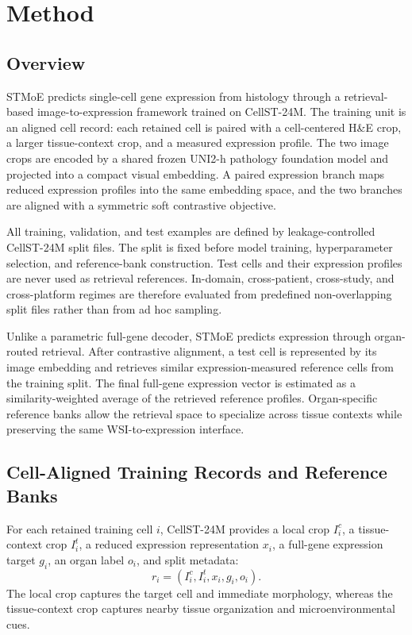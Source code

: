 \documentclass[sigconf]{acmart}
\newcommand{\dataset}{CellST-24M\xspace}
\newcommand{\method}{STMoE\xspace}
\begin{document}
\section{Method}

\subsection{Overview}

\method{} predicts single-cell gene expression from histology through a retrieval-based image-to-expression framework trained on \dataset{}. The training unit is an aligned cell record: each retained cell is paired with a cell-centered H\&E crop, a larger tissue-context crop, and a measured expression profile. The two image crops are encoded by a shared frozen UNI2-h pathology foundation model and projected into a compact visual embedding. A paired expression branch maps reduced expression profiles into the same embedding space, and the two branches are aligned with a symmetric soft contrastive objective.

All training, validation, and test examples are defined by leakage-controlled \dataset{} split files. The split is fixed before model training, hyperparameter selection, and reference-bank construction. Test cells and their expression profiles are never used as retrieval references. In-domain, cross-patient, cross-study, and cross-platform regimes are therefore evaluated from predefined non-overlapping split files rather than from ad hoc sampling.

Unlike a parametric full-gene decoder, \method{} predicts expression through organ-routed retrieval. After contrastive alignment, a test cell is represented by its image embedding and retrieves similar expression-measured reference cells from the training split. The final full-gene expression vector is estimated as a similarity-weighted average of the retrieved reference profiles. Organ-specific reference banks allow the retrieval space to specialize across tissue contexts while preserving the same WSI-to-expression interface.
\subsection{Cell-Aligned Training Records and Reference Banks}

For each retained training cell $i$, \dataset{} provides a local crop $I_i^c$, a tissue-context crop $I_i^t$, a reduced expression representation $x_i$, a full-gene expression target $g_i$, an organ label $o_i$, and split metadata:
\begin{equation}
    r_i = (I_i^c, I_i^t, x_i, g_i, o_i).
\end{equation}
The local crop captures the target cell and immediate morphology, whereas the tissue-context crop captures nearby tissue organization and microenvironmental cues.
\end{document}
